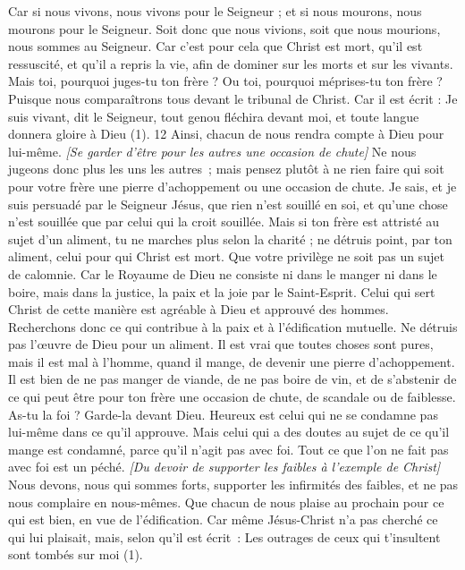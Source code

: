 \begin{multicols}{2}
Car si nous vivons, nous vivons pour le Seigneur ; et si nous mourons, nous mourons pour le Seigneur. Soit donc que nous vivions, soit que nous mourions, nous sommes au Seigneur.
Car c'est pour cela que Christ est mort, qu'il est ressuscité, et qu'il a repris la vie, afin de dominer sur les morts et sur les vivants.
Mais toi, pourquoi juges-tu ton frère ? Ou toi, pourquoi méprises-tu ton frère ? Puisque nous comparaîtrons tous devant le tribunal de Christ.
Car il est écrit : Je suis vivant, dit le Seigneur, tout genou fléchira devant moi, et toute langue donnera gloire à Dieu (1). 12 Ainsi, chacun de nous rendra compte à Dieu pour lui-même.
\textit{[Se garder d'être pour les autres une occasion de chute]}
Ne nous jugeons donc plus les uns les autres ; mais pensez plutôt à ne rien faire qui soit pour votre frère une pierre d’achoppement ou une occasion de chute.
Je sais, et je suis persuadé par le Seigneur Jésus, que rien n'est souillé en soi, et qu’une chose n’est souillée que par celui qui la croit souillée.
Mais si ton frère est attristé au sujet d’un aliment, tu ne marches plus selon la charité ; ne détruis point, par ton aliment, celui pour qui Christ est mort.
Que votre privilège ne soit pas un sujet de calomnie.
Car le Royaume de Dieu ne consiste ni dans le manger ni dans le boire, mais dans la justice, la paix et la joie par le Saint-Esprit.
Celui qui sert Christ de cette manière est agréable à Dieu et approuvé des hommes.
Recherchons donc ce qui contribue à la paix et à l’édification mutuelle.
Ne détruis pas l’œuvre de Dieu pour un aliment. Il est vrai que toutes choses sont pures, mais il est mal à l’homme, quand il mange, de devenir une pierre d’achoppement.
Il est bien de ne pas manger de viande, de ne pas boire de vin, et de s’abstenir de ce qui peut être pour ton frère une occasion de chute, de scandale ou de faiblesse.
As-tu la foi ? Garde-la devant Dieu. Heureux est celui qui ne se condamne pas lui-même dans ce qu'il approuve.
Mais celui qui a des doutes au sujet de ce qu’il mange est condamné, parce qu’il n’agit pas avec foi. Tout ce que l’on ne fait pas avec foi est un péché.
\textit{[Du devoir de supporter les faibles à l'exemple de Christ]}
\VerseOne{}Nous devons, nous qui sommes forts, supporter les infirmités des faibles, et ne pas nous complaire en nous-mêmes.
Que chacun de nous plaise au prochain pour ce qui est bien, en vue de l’édification.
Car même Jésus-Christ n'a pas cherché ce qui lui plaisait, mais, selon qu’il est écrit : Les outrages de ceux qui t’insultent sont tombés sur moi (1).

\end{multicols}
